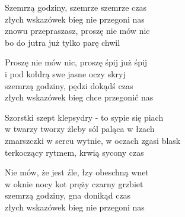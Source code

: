 \begin{text}
    Szemrzą godziny, szemrze szemrze czas\\
    złych wskazówek bieg nie przegoni nas\\
    znowu przepraszasz, proszę nie mów nic\\
    bo do jutra już tylko parę chwil

    Proszę nie mów nic, proszę śpij już śpij\\
    i pod kołdrą swe jasne oczy skryj\\
    szemrzą godziny, pędzi dokądś czas\\
    złych wskazówek bieg chce przegonić nas

    Szorstki szept klepsydry - to sypie się piach\\
    w twarzy tworzy żleby sól paląca w łzach\\
    zmarszczki w sercu wytnie, w oczach zgasi blask\\
    terkoczący rytmem, krwią sycony czas

    Nie mów, że jest źle, łzy obeschną wnet\\
    w oknie nocy kot pręży czarny grzbiet\\
    szemrzą godziny, gna donikąd czas\\
    złych wskazówek bieg nie przegoni nas
\end{text}
\begin{chord}

\end{chord}
